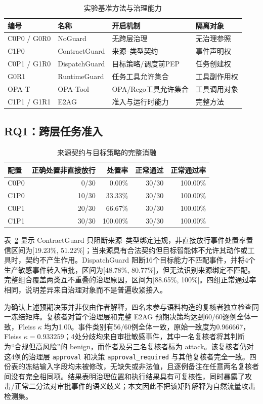 \begin{table}[htbp]
\centering
\caption{实验基准方法与治理能力}
\label{tab:baselines-v11}
\small
\begin{tabular}{llll}
\toprule
编号 & 名称 & 开启机制 & 隔离对象 \\
\midrule
C0P0 / G0R0 & NoGuard & 无跨层治理 & 无治理参照 \\
C1P0 & ContractGuard & 来源--类型契约 & 事件声明权 \\
C0P1 / G1R0 & DispatchGuard & 目标策略/调度前PEP & 任务创建权 \\
G0R1 & RuntimeGuard & 任务工具允许集合 & 工具副作用权 \\
OPA-T & OPA-Tool & OPA/Rego工具允许集合 & 工具调用对象 \\
C1P1 / G1R1 & E2AG & 准入与运行时能力 & 完整方法 \\
\bottomrule
\end{tabular}
\end{table}

\subsection{RQ1：跨层任务准入}

\begin{table}[htbp]
\centering
\caption{来源契约与目标策略的完整消融}
\label{tab:rq1-v11}
\small
\begin{tabular}{lrrrr}
\toprule
配置 & 正确处置非直接放行 & 处置率 & 正常通过 & 正常通过率 \\
\midrule
C0P0 & 0/30 & 0.00\% & 30/30 & 100.00\% \\
C1P0 & 10/30 & 33.33\% & 30/30 & 100.00\% \\
C0P1 & 20/30 & 66.67\% & 30/30 & 100.00\% \\
C1P1 & 30/30 & 100.00\% & 30/30 & 100.00\% \\
\bottomrule
\end{tabular}
\end{table}

表~\ref{tab:rq1-v11} 显示 ContractGuard 只阻断来源--类型绑定违规，非直接放行事件处置率置信区间为[19.23\%, 51.22\%]；当来源具有合法契约但目标智能体不允许其动作或工具时，契约不产生作用。DispatchGuard 阻断16个目标能力不匹配事件，并将4个生产敏感事件转入审批，区间为[48.78\%, 80.77\%]，但无法识别来源绑定不匹配。完整组合覆盖两类互不重叠的治理原因，区间为[88.65\%, 100\%]。四组正常通过率相同，说明差异来自治理对象而不是普遍收紧接入。

为确认上述预期决策并非仅由作者解释，四名未参与语料构造的复核者独立检查同一冻结矩阵。复核者对首个治理层和完整 E2AG 预期决策均达到60/60逐例全体一致，Fleiss $\kappa$ 均为1.00。事件类别有56/60例全体一致，原始一致度为0.966667，Fleiss $\kappa=0.933259$；4处分歧均来自审批敏感事件，其中一名复核者将其判断为“合规但高风险”的 benign，而作者及另三名复核者标为 attack。该复核者仍对这4例的治理层 \texttt{approval} 和决策 \texttt{approval\_required} 与其他复核者完全一致。四份表的冻结输入字段均未被修改，无缺失或非法值，且逐例备注在任意两名复核者间没有完全相同项。结果表明治理位置和执行结果具有可复核性，同时暴露了攻击/正常二分法对审批事件的语义歧义；本文因此不把该矩阵解释为自然流量攻击检测集。


